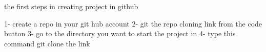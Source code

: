 the first steps in creating project in github 

1- create a repo in your git hub account 
2- git the repo cloning link from the code button 
3- go to the directory you want to start the project in 
4- type this command 
  git clone   the link